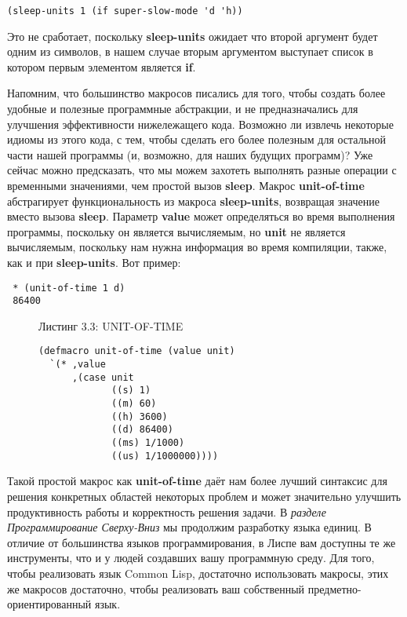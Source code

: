 \begin{verbatim}
(sleep-units 1 (if super-slow-mode 'd 'h))
\end{verbatim}

Это не сработает, поскольку \textbf{sleep-units} ожидает что второй аргумент будет одним из символов, в нашем случае вторым аргументом выступает список в котором первым элементом является \textbf{if}.

Напомним, что большинство макросов писались для того, чтобы создать более удобные и полезные программные абстракции, и не предназначались для улучшения эффективности нижележащего кода. Возможно ли извлечь некоторые идиомы из этого кода, с тем, чтобы сделать его более полезным для остальной части нашей программы (и, возможно, для наших будущих программ)? Уже сейчас можно предсказать, что мы можем захотеть выполнять разные операции с временными значениями, чем простой вызов \textbf{sleep}. Макрос \textbf{unit-of-time} абстрагирует функциональность из макроса \textbf{sleep-units}, возвращая значение вместо вызова \textbf{sleep}. Параметр \textbf{value} может определяться во время выполнения программы, поскольку он является вычисляемым, но \textbf{unit} не является вычисляемым, поскольку нам нужна информация во время компиляции, также, как и при \textbf{sleep-units}. Вот пример:

\begin{verbatim}
 * (unit-of-time 1 d)
 86400
\end{verbatim}

\begin{figure}Листинг 3.3: UNIT-OF-TIME\label{listing_3.3}
\listbegin
\begin{verbatim}
(defmacro unit-of-time (value unit)
  `(* ,value
      ,(case unit
             ((s) 1)
             ((m) 60)
             ((h) 3600)
             ((d) 86400)
             ((ms) 1/1000)
             ((us) 1/1000000))))
\end{verbatim}
\listend
\end{figure}

Такой простой макрос как \textbf{unit-of-time} даёт нам более лучший синтаксис для решения конкретных областей некоторых проблем и может значительно улучшить продуктивность работы и корректность решения задачи. В \emph{разделе Программирование Сверху-Вниз} мы продолжим разработку языка единиц. В отличие от большинства языков программирования, в Лиспе вам доступны те же инструменты, что и у людей создавших вашу программную среду. Для того, чтобы реализовать язык Common Lisp, достаточно использовать макросы, этих же макросов достаточно, чтобы реализовать ваш собственный предметно-ориентированный язык.

